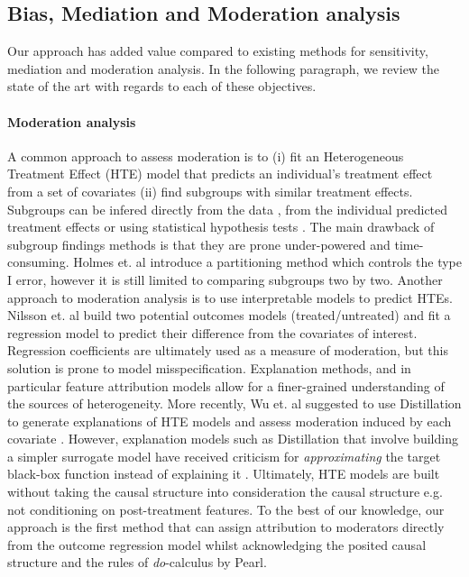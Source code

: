 \subsection{Bias, Mediation and Moderation analysis}
\label{sec:other_analyses}

Our approach has added value compared to existing methods for sensitivity, mediation and moderation analysis. In the following paragraph, we review the state of the art with regards to each of these objectives. \\

\paragraph{Moderation analysis} A common approach to assess moderation is to (i) fit an Heterogeneous Treatment Effect (HTE) model that predicts an individual's treatment effect from a set of covariates (ii) find subgroups with similar treatment effects. Subgroups can be infered directly from the data , from the individual predicted treatment effects  or using statistical hypothesis tests . The main drawback of subgroup findings methods is that they are prone under-powered and time-consuming. Holmes et. al  introduce a partitioning method which controls the type I error, however it is still limited to comparing subgroups two by two. Another approach to moderation analysis is to use interpretable models to predict HTEs. Nilsson et. al  build two potential outcomes models (treated/untreated) and fit a regression model to predict their difference from the covariates of interest. Regression coefficients are ultimately used as a measure of moderation, but this solution is prone to model misspecification. Explanation methods, and in particular feature attribution models allow for a finer-grained understanding of the sources of heterogeneity. More recently, Wu et. al suggested to use Distillation to generate explanations of HTE models and assess moderation induced by each covariate . However, explanation models such as Distillation that involve building a simpler surrogate model have received criticism for \textit{approximating} the target black-box function instead of explaining it . Ultimately, HTE models are built without taking the causal structure into consideration the causal structure e.g. not conditioning on post-treatment features. To the best of our knowledge, our approach is the first method that can assign attribution to moderators directly from the outcome regression model whilst acknowledging the posited causal structure and the rules of \textit{do}-calculus by Pearl. 

